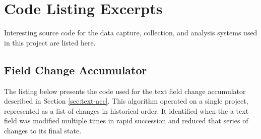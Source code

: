\chapter{Code Listing Excerpts} \label{appendix:listings}

Interesting source code for the data capture, collection, and analysis systems used in this project are listed here. 


\section{Field Change Accumulator}
\label{src:reduceFieldChanges}

The listing below %
presents the code used for the text field change accumulator described in Section \ref{sec:text-acc}. This algorithm operated on a single project, represented as a list of changes in historical order. It identified when the a text field was modified multiple times in rapid succession and reduced that series of changes to its final state.


